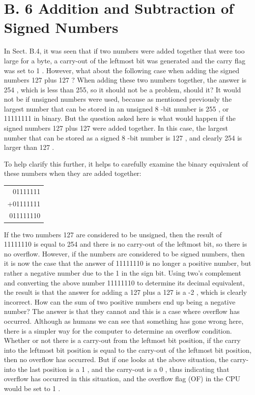 \documentclass[10pt]{article}
\begin{document}
\section*{B. 6 Addition and Subtraction of Signed Numbers}
In Sect. B.4, it was seen that if two numbers were added together that were too large for a byte, a carry-out of the leftmost bit was generated and the carry flag was set to 1 . However, what about the following case when adding the signed numbers 127 plus 127 ? When adding these two numbers together, the answer is 254 , which is less than 255, so it should not be a problem, should it? It would not be if unsigned numbers were used, because as mentioned previously the largest number that can be stored in an unsigned 8 -bit number is 255 , or 11111111 in binary. But the question asked here is what would happen if the signed numbers 127 plus 127 were added together. In this case, the largest number that can be stored as a signed 8 -bit number is 127 , and clearly 254 is larger than 127 .

To help clarify this further, it helps to carefully examine the binary equivalent of these numbers when they are added together:

\begin{center}
\begin{tabular}{r}
01111111 \\
+01111111 \\
\hline
011111110 \\
\hline
\end{tabular}
\end{center}

If the two numbers 127 are considered to be unsigned, then the result of 11111110 is equal to 254 and there is no carry-out of the leftmost bit, so there is no overflow. However, if the numbers are considered to be signed numbers, then it is now the case that the answer of 11111110 is no longer a positive number, but rather a negative number due to the 1 in the sign bit. Using two's complement and converting the above number 11111110 to determine its decimal equivalent, the result is that the answer for adding a 127 plus a 127 is a -2 , which is clearly incorrect. How can the sum of two positive numbers end up being a negative number? The answer is that they cannot and this is a case where overflow has occurred. Although as humans we can see that something has gone wrong here, there is a simpler way for the computer to determine an overflow condition. Whether or not there is a carry-out from the leftmost bit position, if the carry into the leftmost bit position is equal to the carry-out of the leftmost bit position, then no overflow has occurred. But if one looks at the above situation, the carry-into the last position is a 1 , and the carry-out is a 0 , thus indicating that overflow has occurred in this situation, and the overflow flag (OF) in the CPU would be set to 1 .
\end{document}
